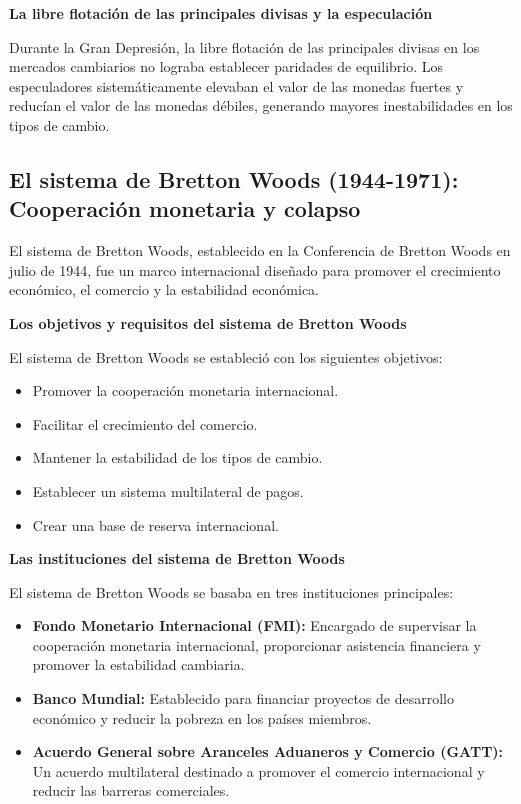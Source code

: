 \documentclass[
  a4paper,
]{article}
\providecommand{\tightlist}{%
  \setlength{\itemsep}{0pt}\setlength{\parskip}{0pt}}\usepackage{longtable,booktabs,array}
\begin{document}
\textbf{La libre flotación de las principales divisas y la especulación}

Durante la Gran Depresión, la libre flotación de las principales divisas
en los mercados cambiarios no lograba establecer paridades de
equilibrio. Los especuladores sistemáticamente elevaban el valor de las
monedas fuertes y reducían el valor de las monedas débiles, generando
mayores inestabilidades en los tipos de cambio.

\hypertarget{el-sistema-de-bretton-woods-1944-1971-cooperaciuxf3n-monetaria-y-colapso}{%
\subsection{El sistema de Bretton Woods (1944-1971): Cooperación
monetaria y
colapso}\label{el-sistema-de-bretton-woods-1944-1971-cooperaciuxf3n-monetaria-y-colapso}}

El sistema de Bretton Woods, establecido en la Conferencia de Bretton
Woods en julio de 1944, fue un marco internacional diseñado para
promover el crecimiento económico, el comercio y la estabilidad
económica.

\textbf{Los objetivos y requisitos del sistema de Bretton Woods}

El sistema de Bretton Woods se estableció con los siguientes objetivos:

\begin{itemize}
\tightlist
\item
  Promover la cooperación monetaria internacional.
\item
  Facilitar el crecimiento del comercio.
\item
  Mantener la estabilidad de los tipos de cambio.
\item
  Establecer un sistema multilateral de pagos.
\item
  Crear una base de reserva internacional.
\end{itemize}

\textbf{Las instituciones del sistema de Bretton Woods}

El sistema de Bretton Woods se basaba en tres instituciones principales:

\begin{itemize}
\tightlist
\item
  \textbf{Fondo Monetario Internacional (FMI):} Encargado de supervisar
  la cooperación monetaria internacional, proporcionar asistencia
  financiera y promover la estabilidad cambiaria.
\item
  \textbf{Banco Mundial:} Establecido para financiar proyectos de
  desarrollo económico y reducir la pobreza en los países miembros.
\item
  \textbf{Acuerdo General sobre Aranceles Aduaneros y Comercio (GATT):}
  Un acuerdo multilateral destinado a promover el comercio internacional
  y reducir las barreras comerciales.
\end{itemize}
\end{document}
